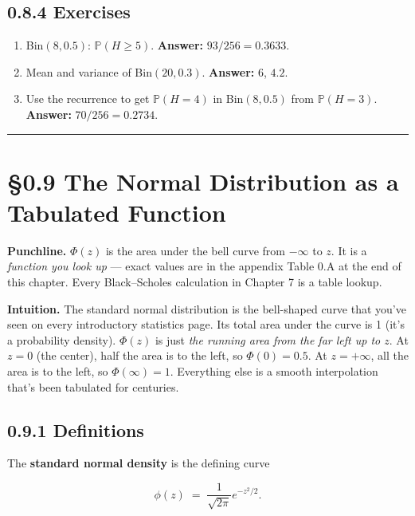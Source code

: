 \documentclass[
  10pt,
  twoside]{book}
\providecommand{\tightlist}{%
  \setlength{\itemsep}{0pt}\setlength{\parskip}{0pt}}
\begin{document}
\subsection{0.8.4 Exercises}\label{exercises-7}

\begin{enumerate}
\def\labelenumi{\arabic{enumi}.}
\tightlist
\item
  Bin\((8, 0.5)\): \(\mathbb{P}(H \geq 5)\). \textbf{Answer:}
  \(93/256 = 0.3633\).
\item
  Mean and variance of Bin\((20, 0.3)\). \textbf{Answer:} \(6\),
  \(4.2\).
\item
  Use the recurrence to get \(\mathbb{P}(H = 4)\) in Bin\((8, 0.5)\)
  from \(\mathbb{P}(H = 3)\). \textbf{Answer:} \(70/256 = 0.2734\).
\end{enumerate}

\begin{center}\rule{0.5\linewidth}{0.5pt}\end{center}

\section{§0.9 The Normal Distribution as a Tabulated
Function}\label{the-normal-distribution-as-a-tabulated-function}

\textbf{Punchline.} \(\Phi(z)\) is the area under the bell curve from
\(-\infty\) to \(z\). It is a \emph{function you look up} --- exact
values are in the appendix Table 0.A at the end of this chapter. Every
Black--Scholes calculation in Chapter 7 is a table lookup.

\textbf{Intuition.} The standard normal distribution is the bell-shaped
curve that you've seen on every introductory statistics page. Its total
area under the curve is 1 (it's a probability density). \(\Phi(z)\) is
just \emph{the running area from the far left up to \(z\)}. At \(z = 0\)
(the center), half the area is to the left, so \(\Phi(0) = 0.5\). At
\(z = +\infty\), all the area is to the left, so \(\Phi(\infty) = 1\).
Everything else is a smooth interpolation that's been tabulated for
centuries.

\subsection{0.9.1 Definitions}\label{definitions-5}

The \textbf{standard normal density} is the defining curve

\[\phi(z) \;=\; \frac{1}{\sqrt{2\pi}} e^{-z^2/2}.\]
\end{document}
